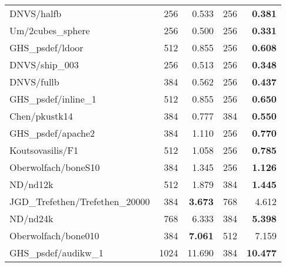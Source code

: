 \begin{tabular}{l|rr|rr}
  DNVS/halfb                      & 256                        & 0.533     & 256 & \bf 0.381  \\
  Um/2cubes\_sphere               & 256                        & 0.500     & 256 & \bf 0.331  \\
  GHS\_psdef/ldoor                & 512                        & 0.855     & 256 & \bf 0.608  \\
  DNVS/ship\_003                  & 256                        & 0.513     & 256 & \bf 0.348  \\
  DNVS/fullb                      & 384                        & 0.562     & 256 & \bf 0.437  \\
  GHS\_psdef/inline\_1            & 512                        & 0.855     & 256 & \bf 0.650  \\
  Chen/pkustk14                   & 384                        & 0.777     & 384 & \bf 0.550  \\
  GHS\_psdef/apache2              & 384                        & 1.110     & 256 & \bf 0.770  \\
  Koutsovasilis/F1                & 512                        & 1.058     & 256 & \bf 0.785  \\
  Oberwolfach/boneS10             & 384                        & 1.345     & 256 & \bf 1.126  \\
  ND/nd12k                        & 512                        & 1.879     & 384 & \bf 1.445  \\
  JGD\_Trefethen/Trefethen\_20000 & 384                        & \bf 3.673 & 768 & 4.612      \\
  ND/nd24k                        & 768                        & 6.333     & 384 & \bf 5.398  \\
  Oberwolfach/bone010             & 384                        & \bf 7.061 & 512 & 7.159      \\
  GHS\_psdef/audikw\_1            & 1024                       & 11.690    & 384 & \bf 10.477 \\
  \hline
\end{tabular}
